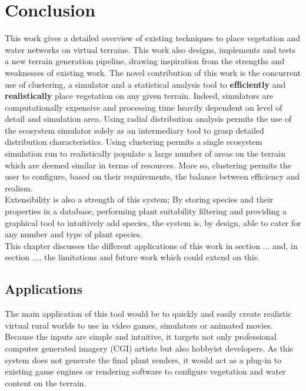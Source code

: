 \chapter{Conclusion} \label{chap:conclusion}

This work gives a detailed overview of existing techniques to place vegetation and water networks on virtual terrains. This work also designs, implements and tests a new terrain generation pipeline, drawing inspiration from the strengths and weaknesses of existing work. The novel contribution of this work is the concurrent use of clustering, a simulator and a statistical analysis tool to \textbf{efficiently} and \textbf{realistically} place vegetation on any given terrain. Indeed, simulators are computationally expensive and processing time heavily dependent on level of detail and simulation area. Using radial distribution analysis permits the use of the ecosystem simulator solely as an intermediary tool to grasp detailed distribution characteristics. Using clustering permits a single ecosystem simulation run to realistically populate a large number of areas on the terrain which are deemed similar in terms of resources. More so, clustering permits the user to configure, based on their requirements, the balance between efficiency and realism. \\
Extensibility is also a strength of this system; By storing species and their properties in a database, performing plant suitability filtering and providing a graphical tool to intuitively add species, the system is, by design, able to cater for any number and type of plant species.\\
This chapter discusses the different applications of this work in section ... and, in section ..., the limitations and future work which could extend on this.

\section{Applications} \label{sec:applications}

The main application of this tool would be to quickly and easily create realistic virtual rural worlds to use in video games, simulators or animated movies. Because the inputs are simple and intuitive, it targets not only professional computer generated imagery (CGI) artists but also hobbyist developers. As this system does not generate the final plant renders, it would act as a plug-in to existing game engines or rendering software to configure vegetation and water content on the terrain.\\

